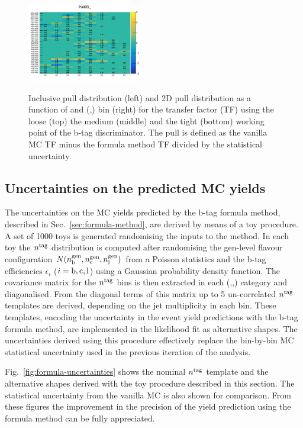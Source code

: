 \begin{figure}[h!]
  \includegraphics[width=0.45\textwidth]{figures/btagformula/validation/TFValidation2DSingleMu_tight} \\
  \caption{\label{fig:formula-validation-TF}
  Inclusive pull distribution (left) and 2D pull distribution as a function of \scalht and (\njet,\nb) bin (right) for
  the \mj transfer factor (TF) using the loose (top) the medium (middle) and the tight (bottom) working point of the b-tag discriminator. 
  The pull is defined as the vanilla MC TF minus the formula method TF divided by the statistical uncertainty. }
\end{figure}



\subsection{Uncertainties on the predicted MC yields}
\label{sec:formula-uncertainties}
The uncertainties on the MC yields predicted by the b-tag formula method, described in Sec.~\ref{sec:formula-method}, 
are derived by means of a toy procedure. 
A set of 1000 toys is generated randomising the inputs to the method. 
In each toy the $n^{\rm tag}$ distribution is computed after randomising 
the gen-level flavour configuration $N(n_{\rm b}^{\rm gen},n_{\rm c}^{\rm gen},n_{\rm l}^{\rm gen})$ 
from a Poisson statistics and the b-tag efficiencies $\epsilon_{i}$ ($i=\rm b,\rm c,\rm l$) using a Gaussian probability density function. 
The covariance matrix for the $n^{\rm tag}$ bins is then extracted in each (\njet,\scalht,\mht) category and diagonalised. 
From the diagonal terms of this matrix up to 5 un-correlated $n^{\rm tag}$ templates are derived, 
depending on the jet multiplicity in each bin. 
These templates, encoding the uncertainty in the event yield predictions with the b-tag formula method, 
are implemented in the likelihood fit as alternative shapes. 
The uncertainties derived using this procedure effectively replace the bin-by-bin MC statistical uncertainty 
used in the previous iteration of the analysis. 

Fig.~\ref{fig:formula-uncertainties} shows the nominal $n^{\rm tag}$ template and the alternative shapes derived with 
the toy procedure described in this section. 
The statistical uncertainty from the vanilla MC is also shown for comparison. 
From these figures the improvement in the precision of the yield prediction using the formula method can be fully appreciated. 

